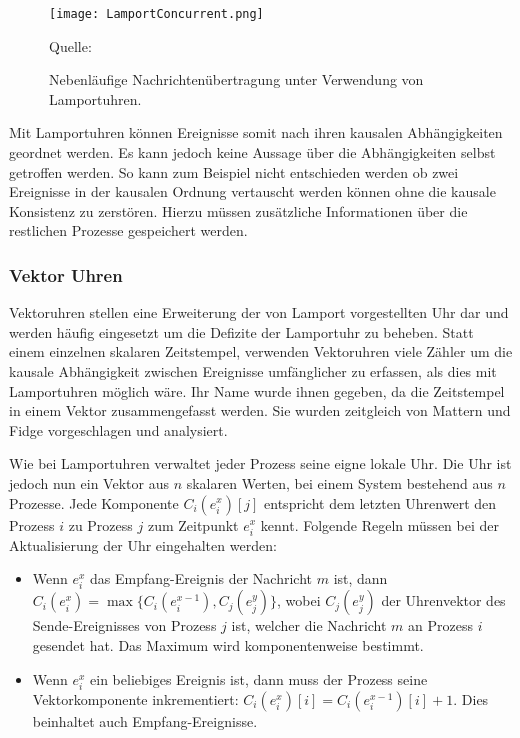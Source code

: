 \begin{figure}[ht]
    \centering
    \texttt{[image: LamportConcurrent.png]}
    \caption[Lamportuhren und Kausalität]{Nebenläufige Nachrichtenübertragung unter Verwendung von Lamportuhren.}
    Quelle: \cite{tanenbaum2007distributed}
    \label{fig:LamportConcurrent}
\end{figure}

Mit Lamportuhren können Ereignisse somit nach ihren kausalen Abhängigkeiten geordnet werden.
Es kann jedoch keine Aussage über die Abhängigkeiten selbst getroffen werden.
So kann zum Beispiel nicht entschieden werden ob zwei Ereignisse in der kausalen Ordnung vertauscht werden können ohne die kausale Konsistenz zu zerstören.
Hierzu müssen zusätzliche Informationen über die restlichen Prozesse gespeichert werden.

\subsubsection{Vektor Uhren}
Vektoruhren stellen eine Erweiterung der von Lamport vorgestellten Uhr dar und werden häufig eingesetzt um die Defizite der Lamportuhr zu beheben.
Statt einem einzelnen skalaren Zeitstempel, verwenden Vektoruhren viele Zähler um die kausale Abhängigkeit zwischen Ereignisse umfänglicher zu erfassen, als dies mit Lamportuhren möglich wäre.
Ihr Name wurde ihnen gegeben, da die Zeitstempel in einem Vektor zusammengefasst werden.
Sie wurden zeitgleich von Mattern \cite{bibid} und Fidge \cite{bibid} vorgeschlagen und analysiert.

Wie bei Lamportuhren verwaltet jeder Prozess seine eigne lokale Uhr.
Die Uhr ist jedoch nun ein Vektor aus $n$ skalaren Werten, bei einem System bestehend aus $n$ Prozesse.
Jede Komponente $C_i(e_i^x)[j]$ entspricht dem letzten Uhrenwert den Prozess $i$ zu Prozess $j$ zum Zeitpunkt $e_i^x$ kennt.
Folgende Regeln müssen bei der Aktualisierung der Uhr eingehalten werden:
\begin{itemize}
    \item Wenn $e_i^x$ das Empfang-Ereignis der Nachricht $m$ ist, dann $C_i(e_i^x)=\max\{ C_i(e_i^{x-1}), C_j(e_j^y) \}$, wobei $C_j(e_j^y)$ der Uhrenvektor des Sende-Ereignisses von Prozess $j$ ist, welcher die Nachricht $m$ an Prozess $i$ gesendet hat. Das Maximum wird komponentenweise bestimmt.
    \item Wenn $e_i^x$ ein beliebiges Ereignis ist, dann muss der Prozess seine Vektorkomponente inkrementiert: $C_i(e_i^x)[i]=C_i(e_i^{x-1})[i] + 1$. Dies beinhaltet auch Empfang-Ereignisse.
\end{itemize}

